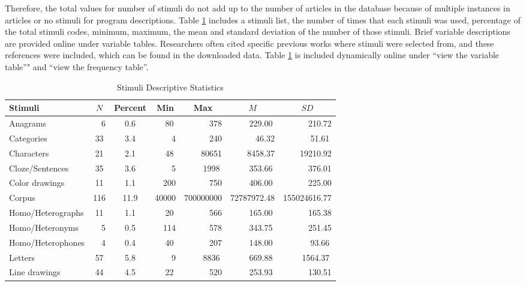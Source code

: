 \documentclass[english,,man]{apa6}
\theoremstyle{definition}
\theoremstyle{definition}
\theoremstyle{definition}
\theoremstyle{remark}
\begin{document}
Therefore, the total values for number of stimuli do not add up to the
number of articles in the database because of multiple instances in
articles or no stimuli for program descriptions. Table
\ref{tab:stim-table} includes a stimuli list, the number of times that
each stimuli was used, percentage of the total stimuli codes, minimum,
maximum, the mean and standard deviation of the number of those stimuli.
Brief variable descriptions are provided online under variable tables.
Researchers often cited specific previous works where stimuli were
selected from, and these references were included, which can be found in
the downloaded data. Table \ref{tab:stim-table} is included dynamically
online under \enquote{view the variable table}" and \enquote{view the
frequency table}.

\begin{table}[tbp]
\begin{center}
\begin{threeparttable}
\caption{\label{tab:stim-table}Stimuli Descriptive Statistics}
\small{
\begin{tabular}{lcccccc}
\toprule
Stimuli & $N$ & Percent & Min & Max & $M$ & $SD$\\
\midrule
Anagrams & \ \ 6 & 0.6 & \ \  80 & \ \ \ \ \ \ 378 & \ \ \ \  229.00 & \ \ \ \ \ \ 210.72\\
Categories & 33 & 3.4 & \ \ \ \ 4 & \ \ \ \ \ \ 240 & \ \ \ \ \ \ 46.32 & \ \ \ \ \ \  51.61\\
Characters & 21 & 2.1 & \ \  48 & \ \ \ \ 80651 & \ \ \ \ 8458.37 & \ \ \ \ 19210.92\\
Cloze/Sentences & 35 & 3.6 & \ \ \ \ 5 & \ \ \ \  1998 & \ \ \ \  353.66 & \ \ \ \ \ \ 376.01\\
Color drawings & 11 & 1.1 & \ \ 200 & \ \ \ \ \ \ 750 & \ \ \ \  406.00 & \ \ \ \ \ \ 225.00\\
Corpus & 116 & 11.9 & 40000 & 700000000 & 72787972.48 & 155024616.77\\
Homo/Heterographs & 11 & 1.1 & \ \  20 & \ \ \ \ \ \ 566 & \ \ \ \  165.00 & \ \ \ \ \ \ 165.38\\
Homo/Heteronyms & \ \ 5 & 0.5 & \ \ 114 & \ \ \ \ \ \ 578 & \ \ \ \  343.75 & \ \ \ \ \ \ 251.45\\
Homo/Heterophones & \ \ 4 & 0.4 & \ \  40 & \ \ \ \ \ \ 207 & \ \ \ \  148.00 & \ \ \ \ \ \  93.66\\
Letters & 57 & 5.8 & \ \ \ \ 9 & \ \ \ \  8836 & \ \ \ \  669.88 & \ \ \ \  1564.37\\
Line drawings & 44 & 4.5 & \ \  22 & \ \ \ \ \ \ 520 & \ \ \ \  253.93 & \ \ \ \ \ \ 130.51\\

\end{tabular}}
\end{threeparttable}
\end{center}
\end{table}
\end{document}
